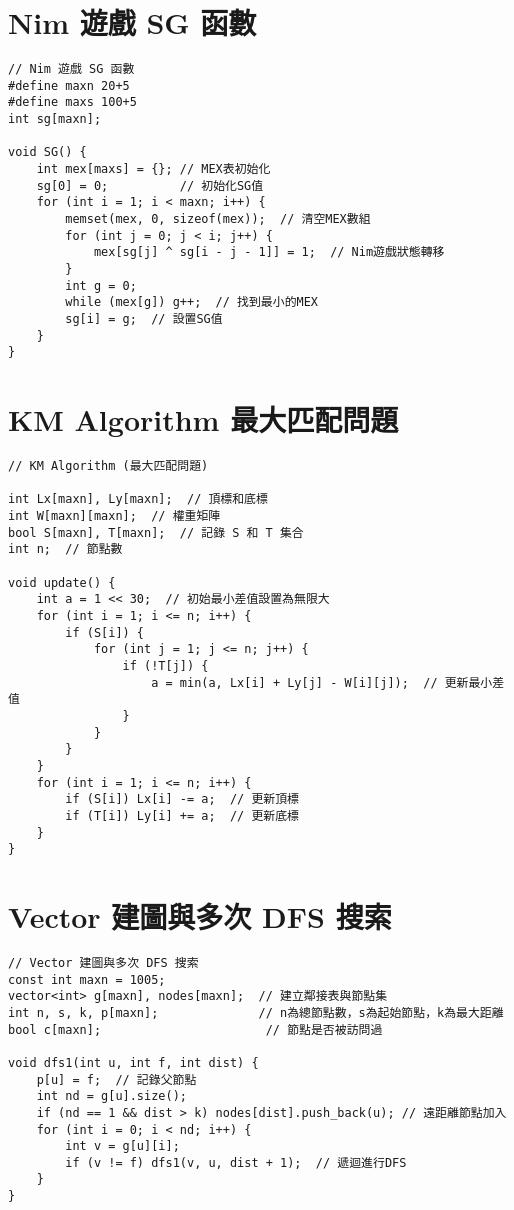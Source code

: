 \documentclass{article}
\begin{document}
\begin{multicols}{2}
\section{Nim 遊戲 SG 函數}

\begin{lstlisting}
// Nim 遊戲 SG 函數
#define maxn 20+5
#define maxs 100+5
int sg[maxn];

void SG() {
    int mex[maxs] = {}; // MEX表初始化
    sg[0] = 0;          // 初始化SG值
    for (int i = 1; i < maxn; i++) {
        memset(mex, 0, sizeof(mex));  // 清空MEX數組
        for (int j = 0; j < i; j++) {
            mex[sg[j] ^ sg[i - j - 1]] = 1;  // Nim遊戲狀態轉移
        }
        int g = 0;
        while (mex[g]) g++;  // 找到最小的MEX
        sg[i] = g;  // 設置SG值
    }
}
\end{lstlisting}

\section{KM Algorithm 最大匹配問題}

\begin{lstlisting}
// KM Algorithm (最大匹配問題)

int Lx[maxn], Ly[maxn];  // 頂標和底標
int W[maxn][maxn];  // 權重矩陣
bool S[maxn], T[maxn];  // 記錄 S 和 T 集合
int n;  // 節點數

void update() {
    int a = 1 << 30;  // 初始最小差值設置為無限大
    for (int i = 1; i <= n; i++) {
        if (S[i]) {
            for (int j = 1; j <= n; j++) {
                if (!T[j]) {
                    a = min(a, Lx[i] + Ly[j] - W[i][j]);  // 更新最小差值
                }
            }
        }
    }
    for (int i = 1; i <= n; i++) {
        if (S[i]) Lx[i] -= a;  // 更新頂標
        if (T[i]) Ly[i] += a;  // 更新底標
    }
}
\end{lstlisting}

\section{Vector 建圖與多次 DFS 搜索}

\begin{lstlisting}
// Vector 建圖與多次 DFS 搜索
const int maxn = 1005;
vector<int> g[maxn], nodes[maxn];  // 建立鄰接表與節點集
int n, s, k, p[maxn];              // n為總節點數，s為起始節點，k為最大距離
bool c[maxn];                       // 節點是否被訪問過

void dfs1(int u, int f, int dist) {
    p[u] = f;  // 記錄父節點
    int nd = g[u].size();
    if (nd == 1 && dist > k) nodes[dist].push_back(u); // 遠距離節點加入
    for (int i = 0; i < nd; i++) {
        int v = g[u][i];
        if (v != f) dfs1(v, u, dist + 1);  // 遞迴進行DFS
    }
}


\end{lstlisting}
\end{multicols}
\end{document}
